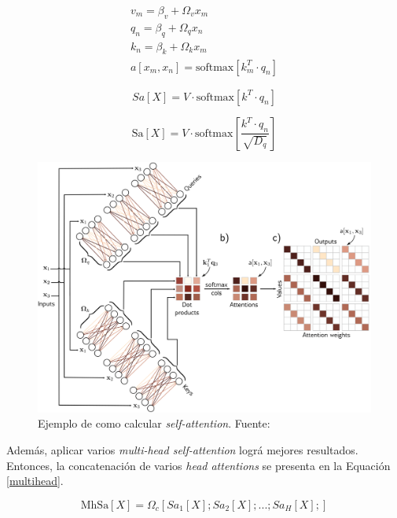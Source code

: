 \begin{equation}\label{eq:attention}
	\begin{gathered}
	v_m = \beta_v + \Omega_vx_m \\
	q_n = \beta_q + \Omega_qx_n \\
	k_n = \beta_k + \Omega_kx_m \\
	a[x_m, x_n] = \mbox{softmax}[k_m^T \cdot q_n]
	\end{gathered}
\end{equation}

\begin{equation}\label{eq:self-attention}
	Sa[X] = V \cdot \mbox{softmax}[ k^T \cdot q_n ]   
\end{equation}

\begin{equation}\label{eq:scaled-self-attention}
	\mbox{Sa}[X] = V \cdot \mbox{softmax}\left[ \frac{k^T \cdot q_n}{ \sqrt{D_q} }   \right]   
\end{equation}


\begin{figure}
	\centering
	\includegraphics[width=\textwidth]{../img/theory/t_1}
	\caption{Ejemplo de como calcular \textit{self-attention}. Fuente: \cite{prince2023understanding}}
	\label{fig:t_1}
\end{figure}

Además, aplicar varios \textit{multi-head self-attention} lográ mejores resultados. Entonces, la concatenación de varios \textit{head attentions} se presenta en la Equación \ref{multihead}.

\begin{equation}\label{multihead}
	\mbox{MhSa}[X] = \Omega_c[Sa_1[X]; Sa_2[X];...;Sa_H[X];]
\end{equation}

